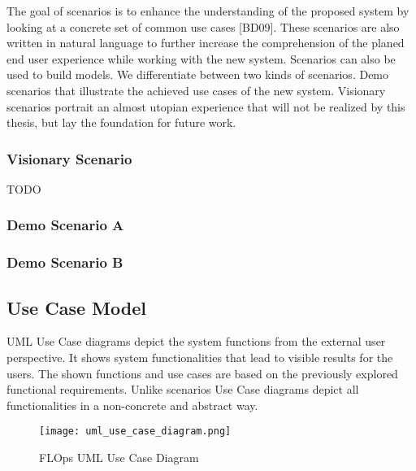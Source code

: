 The goal of scenarios is to enhance the understanding of the proposed system by looking at a concrete set of common use cases [BD09].
These scenarios are also written in natural language to further increase the comprehension of the planed end user experience while working with the new system.
Scenarios can also be used to build models. We differentiate between two kinds of scenarios.
Demo scenarios that illustrate the achieved use cases of the new system.
Visionary scenarios portrait an almost utopian experience that will not be realized by this thesis, but lay the foundation for future work.

\subsubsection{Visionary Scenario}
TODO
\subsubsection{Demo Scenario A}

\subsubsection{Demo Scenario B}

\subsection{Use Case Model}
UML Use Case diagrams depict the system functions from the external user perspective.
It shows system functionalities that lead to visible results for the users.
The shown functions and use cases are based on the previously explored functional requirements.
Unlike scenarios Use Case diagrams depict all functionalities in a non-concrete and abstract way. \cite{book:bruegge}

\begin{figure}[p]
    \begin{adjustwidth}{-0.1\paperwidth}{-0.1\paperwidth}
        \centering
        \texttt{[image: uml\_use\_case\_diagram.png]}
        \caption{FLOps UML Use Case Diagram}
        \label{fig:uml_use_case_diagram}
    \end{adjustwidth}
\end{figure}

